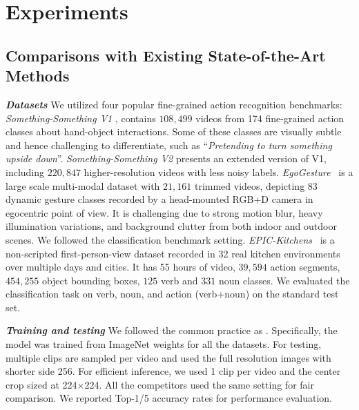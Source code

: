 \documentclass[runningheads]{llncs}
\newcommand{\keypoint}[1]{\vspace{0.1cm}\noindent\textbf{#1}\quad}
\begin{document}
\section{Experiments}
\label{sec:experiments}

\subsection{Comparisons with Existing State-of-the-Art Methods}

\keypoint{\em Datasets}
We utilized four popular fine-grained action recognition
benchmarks:
{\em Something-Something V1} \cite{goyal2017something}, 
contains $108,499$ videos
from 174 fine-grained action classes 
about hand-object interactions. Some of these classes 
are visually subtle and hence challenging to differentiate, 
such as ``{\em Pretending to turn something upside down}''. 
{\em Something-Something V2} \cite{mahdisoltani2018fine} presents an extended version of V1,
including $220,847$ higher-resolution videos 
with less noisy labels.
{\em EgoGesture}~\cite{zhang2018egogesture} is a 
large scale multi-modal dataset with $21,161$ trimmed videos, 
depicting 83 dynamic gesture classes recorded 
by a head-mounted RGB+D camera in egocentric point of view.
It is challenging due to strong motion blur, heavy
illumination variations, and background clutter
from both indoor and outdoor scenes.
We followed the classification benchmark setting.
{\em EPIC-Kitchens}~\cite{damen2018scaling} is a non-scripted
first-person-view dataset
recorded in 32 real kitchen
environments over multiple days and cities.
It has 55 hours of video, $39,594$ action
segments, $454,255$ object bounding boxes, 
$125$ verb and $331$ noun classes.
We evaluated the classification task 
on verb, noun, and action (verb+noun)
on the standard test set.


\keypoint{\em Training and testing }
We followed the common practice as \cite{lin2019tsm,wang2018non}.
Specifically, the model was trained from 
ImageNet weights
for all the datasets.
For testing, multiple clips are sampled per video and used the full resolution images with shorter side 256.  For efficient inference, we used 1 clip per video and the center crop sized at 224$\times$224.
All the competitors used the same setting for fair comparison.
We reported Top-1/5 accuracy rates for performance evaluation.
\end{document}
